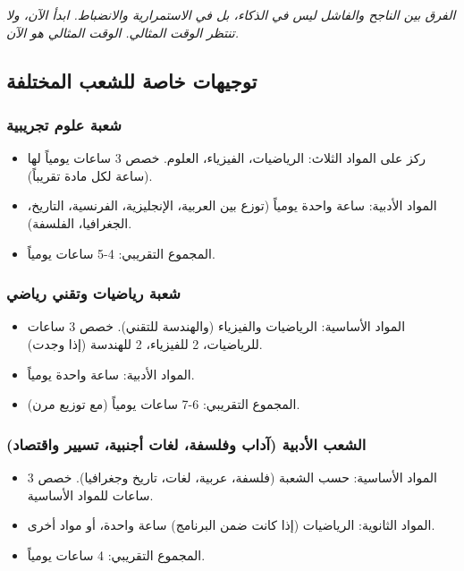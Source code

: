 \documentclass[12pt,a4paper]{book}
\newcommand{\quoteAr}[1]{%
	\begin{myquote}
		\itshape #1
	\end{myquote}
}
\begin{document}
	\quoteAr{الفرق بين الناجح والفاشل ليس في الذكاء، بل في الاستمرارية والانضباط. ابدأ الآن، ولا تنتظر الوقت المثالي. الوقت المثالي هو الآن.}
	
	\subsection{توجيهات خاصة للشعب المختلفة}
	
	\subsubsection{شعبة علوم تجريبية}
	\begin{itemize}
		\item ركز على المواد الثلاث: الرياضيات، الفيزياء، العلوم. خصص 3 ساعات يومياً لها (ساعة لكل مادة تقريباً).
		\item المواد الأدبية: ساعة واحدة يومياً (توزع بين العربية، الإنجليزية، الفرنسية، التاريخ، الجغرافيا، الفلسفة).
		\item المجموع التقريبي: 4-5 ساعات يومياً.
	\end{itemize}
	
	\subsubsection{شعبة رياضيات وتقني رياضي}
	\begin{itemize}
		\item المواد الأساسية: الرياضيات والفيزياء (والهندسة للتقني). خصص 3 ساعات للرياضيات، 2 للفيزياء، 2 للهندسة (إذا وجدت).
		\item المواد الأدبية: ساعة واحدة يومياً.
		\item المجموع التقريبي: 6-7 ساعات يومياً (مع توزيع مرن).
	\end{itemize}
	
	\subsubsection{الشعب الأدبية (آداب وفلسفة، لغات أجنبية، تسيير واقتصاد)}
	\begin{itemize}
		\item المواد الأساسية: حسب الشعبة (فلسفة، عربية، لغات، تاريخ وجغرافيا). خصص 3 ساعات للمواد الأساسية.
		\item المواد الثانوية: الرياضيات (إذا كانت ضمن البرنامج) ساعة واحدة، أو مواد أخرى.
		\item المجموع التقريبي: 4 ساعات يومياً.
	\end{itemize}
	
\end{document}

